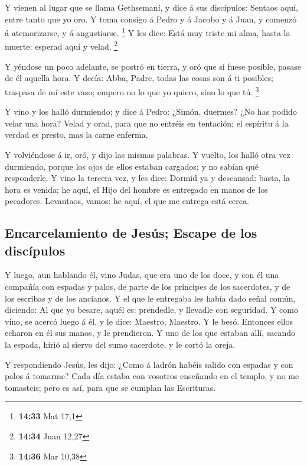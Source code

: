  Y vienen al lugar que se llama Gethsemaní, y dice á sus
discípulos: Sentaos aquí, entre tanto que yo oro.  Y toma
consigo á Pedro y á Jacobo y á Juan, y comenzó á atemorizarse, y á
angustiarse. \footnote{\textbf{14:33} Mat 17,1}  Y les
dice: Está muy triste mi alma, hasta la muerte: esperad aquí y velad.
\footnote{\textbf{14:34} Juan 12,27}

 Y yéndose un poco adelante, se postró en tierra, y oró
que si fuese posible, pasase de él aquella hora.  Y
decía: Abba, Padre, todas las cosas son á ti posibles; traspasa de mí
este vaso; empero no lo que yo quiero, sino lo que tú. \footnote{\textbf{14:36}
  Mar 10,38}

 Y vino y los halló durmiendo; y dice á Pedro: ¿Simón,
duermes? ¿No has podido velar una hora?  Velad y orad,
para que no entréis en tentación: el espíritu á la verdad es presto, mas
la carne enferma.

 Y volviéndose á ir, oró, y dijo las mismas palabras.
 Y vuelto, los halló otra vez durmiendo, porque los ojos
de ellos estaban cargados; y no sabían qué responderle. 
Y vino la tercera vez, y les dice: Dormid ya y descansad: basta, la hora
es venida; he aquí, el Hijo del hombre es entregado en manos de los
pecadores.  Levantaos, vamos: he aquí, el que me entrega
está cerca.

\hypertarget{encarcelamiento-de-jesuxfas-escape-de-los-discuxedpulos}{%
\subsection{Encarcelamiento de Jesús; Escape de los
discípulos}\label{encarcelamiento-de-jesuxfas-escape-de-los-discuxedpulos}}

 Y luego, aun hablando él, vino Judas, que era uno de los
doce, y con él una compañía con espadas y palos, de parte de los
príncipes de los sacerdotes, y de los escribas y de los ancianos.
 Y el que le entregaba les había dado señal común,
diciendo: Al que yo besare, aquél es: prendedle, y llevadle con
seguridad.  Y como vino, se acercó luego á él, y le dice:
Maestro, Maestro. Y le besó.  Entonces ellos echaron en
él sus manos, y le prendieron.  Y uno de los que estaban
allí, sacando la espada, hirió al siervo del sumo sacerdote, y le cortó
la oreja.

 Y respondiendo Jesús, les dijo: ¿Como á ladrón habéis
salido con espadas y con palos á tomarme?  Cada día
estaba con vosotros enseñando en el templo, y no me tomasteis; pero es
así, para que se cumplan las Escrituras.

